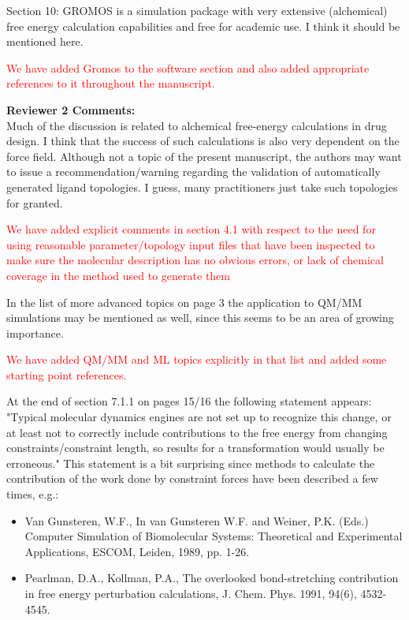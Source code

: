 \documentclass[11pt,a4paper]{letter} %
\begin{document}
\begin{letter}
Section 10: GROMOS is a simulation package with very extensive (alchemical) free energy calculation capabilities and free for academic use. I think it should be mentioned here.

\textcolor{red}{We have added Gromos to the software section and also added appropriate references to it throughout the manuscript.}

\textbf{Reviewer 2 Comments:}\\
Much of the discussion is related to alchemical free-energy calculations in drug design. I think that the success of such calculations is also very dependent on the force field. Although not a topic of the present manuscript, the authors may want to issue a recommendation/warning regarding the validation of automatically generated ligand topologies. I guess, many practitioners just take such topologies for granted.

\textcolor{red}{We have added explicit comments in section 4.1 with respect to the need for using reasonable parameter/topology input files that have been inspected to make sure the molecular description has no obvious errors, or lack of chemical coverage in the method used to generate them}

In the list of more advanced topics on page 3 the application to QM/MM simulations may be mentioned as well, since this seems to be an area of growing importance.

\textcolor{red}{We have added QM/MM and ML topics explicitly in that list and added some starting point references.}  

At the end of section 7.1.1 on pages 15/16 the following statement appears: "Typical molecular dynamics engines are not set up to recognize this change, or at least not to correctly include contributions to the free energy from changing constraints/constraint length, so results for a transformation would usually be erroneous." This statement is a bit surprising since methods to calculate the contribution of the work done by constraint forces have been described a few times, e.g.: 
\begin{itemize}

    \item Van Gunsteren, W.F., In van Gunsteren W.F. and Weiner, P.K. (Eds.) Computer Simulation of Biomolecular Systems: Theoretical and Experimental Applications, ESCOM, Leiden, 1989, pp. 1-26. 

    \item Pearlman, D.A., Kollman, P.A., The overlooked bond-stretching contribution in free energy perturbation calculations, J. Chem. Phys. 1991, 94(6), 4532-4545.


\end{itemize}
\end{letter}
\end{document}

